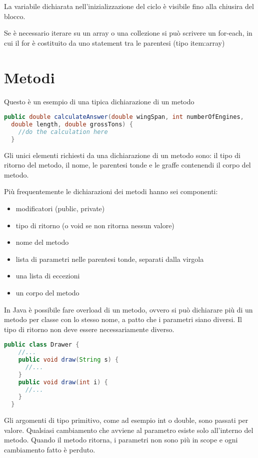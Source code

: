 \documentclass[a4paper,12pt,twoside]{book}
\begin{document}
La variabile dichiarata nell'inizializzazione del ciclo è visibile
fino alla chiusira del blocco.

Se è necessario iterare su un array o una collezione si può scrivere
un for-each, in cui il for è costituito da uno statement tra le
parentesi (tipo item:array)

\section{Metodi}

Questo è un esempio di una tipica dichiarazione di un metodo
\begin{lstlisting}[caption={metodo},
  label={lst:method},language=Java]
  public double calculateAnswer(double wingSpan, int numberOfEngines,
  double length, double grossTons) {
    //do the calculation here
  }
\end{lstlisting}
Gli unici elementi richiesti da una dichiarazione di un metodo sono: il tipo
di ritorno del metodo, il nome, le parentesi tonde e le graffe
contenendi il corpo del metodo.

Più frequentemente le dichiarazioni dei metodi hanno sei componenti:
\begin{itemize}
\item modificatori (public, private)
\item tipo di ritorno (o void se non ritorna nessun valore)
\item nome del metodo
\item lista di parametri nelle parentesi tonde, separati dalla virgola
\item una lista di eccezioni
\item un corpo del metodo
\end{itemize}

In Java è possibile fare overload di un metodo, ovvero si può
dichiarare più di un metodo per classe con lo stesso nome, a patto che
i parametri siano diversi. Il tipo di ritorno non deve essere
necessariamente diverso.
\begin{lstlisting}[caption={overload},
  label={lst:overload},language=Java]
  public class Drawer {
    //...
    public void draw(String s) {
      //...
    }
    public void draw(int i) {
      //...
    }
  }
\end{lstlisting}


Gli argomenti di tipo primitivo, come ad esempio int o double, sono
passati per valore. Qualsiasi cambiamento che avviene al parametro
esiste solo all’interno del metodo. Quando il metodo ritorna, i
parametri non sono più in scope e ogni cambiamento fatto è perduto.
\end{document}
